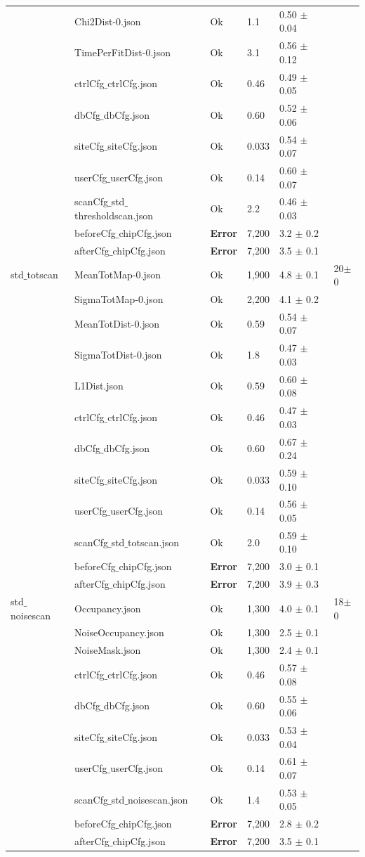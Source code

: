 {\begin{longtable}{|llllll|}
 & Chi2Dist-0.json & Ok & 1.1 & 0.50 $\pm$ 0.04 & \\
 & TimePerFitDist-0.json & Ok & 3.1 & 0.56 $\pm$ 0.12 & \\
 & ctrlCfg$\_$ctrlCfg.json & Ok & 0.46 & 0.49 $\pm$ 0.05 & \\
 & dbCfg$\_$dbCfg.json & Ok & 0.60 & 0.52 $\pm$ 0.06 & \\
 & siteCfg$\_$siteCfg.json & Ok & 0.033 & 0.54 $\pm$ 0.07 & \\
 & userCfg$\_$userCfg.json & Ok & 0.14 & 0.60 $\pm$ 0.07 & \\
 & scanCfg$\_$std$\_$thresholdscan.json & Ok & 2.2 & 0.46 $\pm$ 0.03 & \\
 & beforeCfg$\_$chipCfg.json & { \bf Error} & 7,200 & 3.2 $\pm$ 0.2 & \\
 & afterCfg$\_$chipCfg.json & { \bf Error} & 7,200 & 3.5 $\pm$ 0.1 & \\
\hline
std$\_$totscan & MeanTotMap-0.json & Ok & 1,900 & 4.8 $\pm$ 0.1 & 20$\pm$0\\
 & SigmaTotMap-0.json & Ok & 2,200 & 4.1 $\pm$ 0.2 & \\
 & MeanTotDist-0.json & Ok & 0.59 & 0.54 $\pm$ 0.07 & \\
 & SigmaTotDist-0.json & Ok & 1.8 & 0.47 $\pm$ 0.03 & \\
 & L1Dist.json & Ok & 0.59 & 0.60 $\pm$ 0.08 & \\
 & ctrlCfg$\_$ctrlCfg.json & Ok & 0.46 & 0.47 $\pm$ 0.03 & \\
 & dbCfg$\_$dbCfg.json & Ok & 0.60 & 0.67 $\pm$ 0.24 & \\
 & siteCfg$\_$siteCfg.json & Ok & 0.033 & 0.59 $\pm$ 0.10 & \\
 & userCfg$\_$userCfg.json & Ok & 0.14 & 0.56 $\pm$ 0.05 & \\
 & scanCfg$\_$std$\_$totscan.json & Ok & 2.0 & 0.59 $\pm$ 0.10 & \\
 & beforeCfg$\_$chipCfg.json & { \bf Error} & 7,200 & 3.0 $\pm$ 0.1 & \\
 & afterCfg$\_$chipCfg.json & { \bf Error} & 7,200 & 3.9 $\pm$ 0.3 & \\
\hline
std$\_$noisescan & Occupancy.json & Ok & 1,300 & 4.0 $\pm$ 0.1 & 18$\pm$0\\
 & NoiseOccupancy.json & Ok & 1,300 & 2.5 $\pm$ 0.1 & \\
 & NoiseMask.json & Ok & 1,300 & 2.4 $\pm$ 0.1 & \\
 & ctrlCfg$\_$ctrlCfg.json & Ok & 0.46 & 0.57 $\pm$ 0.08 & \\
 & dbCfg$\_$dbCfg.json & Ok & 0.60 & 0.55 $\pm$ 0.06 & \\
 & siteCfg$\_$siteCfg.json & Ok & 0.033 & 0.53 $\pm$ 0.04 & \\
 & userCfg$\_$userCfg.json & Ok & 0.14 & 0.61 $\pm$ 0.07 & \\
 & scanCfg$\_$std$\_$noisescan.json & Ok & 1.4 & 0.53 $\pm$ 0.05 & \\
 & beforeCfg$\_$chipCfg.json & { \bf Error} & 7,200 & 2.8 $\pm$ 0.2 & \\
 & afterCfg$\_$chipCfg.json & { \bf Error} & 7,200 & 3.5 $\pm$ 0.1 & \\
\hline
\end{longtable}
}

